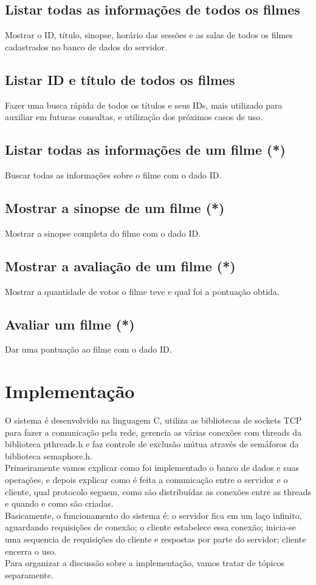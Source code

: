 \documentclass[11pt,twoside]{article}
\begin{document}
\subsection{Listar todas as informações de todos os filmes}
Mostrar o ID, título, sinopse, horário das sessões e as salas de todos os filmes cadastrados no banco de dados do servidor.
\subsection{Listar ID e título de todos os filmes}
Fazer uma busca rápida de todos os títulos e seus IDs, mais utilizado para auxiliar em futuras consultas, e utilização dos próximos casos de uso.
\subsection{Listar todas as informações de um filme (*)}
Buscar todas as informações sobre o filme com o dado ID.
\subsection{Mostrar a sinopse de um filme (*)}
Mostrar a sinopse completa do filme com o dado ID.
\subsection{Mostrar a avaliação de um filme (*)}
Mostrar a quantidade de votos o filme teve e qual foi a pontuação obtida.
\subsection{Avaliar um filme (*)}
Dar uma pontuação ao filme com o dado ID.



\section{Implementação}
O sistema é desenvolvido na linguagem C, utiliza as bibliotecas de sockets TCP para fazer a comunicação pela rede, gerencia as várias conexões com threads da biblioteca pthreads.h e faz controle de exclusão mútua através de semáforos da biblioteca semaphore.h.\\
Primeiramente vamos explicar como foi implementado o banco de dados e suas operações, e depois explicar como é feita a comunicação entre o servidor e o cliente, qual protocolo seguem, como são distribuídas as conexões entre as threads e quando e como são criadas.\\
Basicamente, o funcionamento do sistema é: o servidor fica em um laço infinito, aguardando requisições de conexão; o cliente estabelece essa conexão; inicia-se uma sequencia de requisições do cliente e respostas por parte do servidor; cliente encerra o uso.\\
Para organizar a discussão sobre a implementação, vamos tratar de tópicos separamente.
\end{document}

